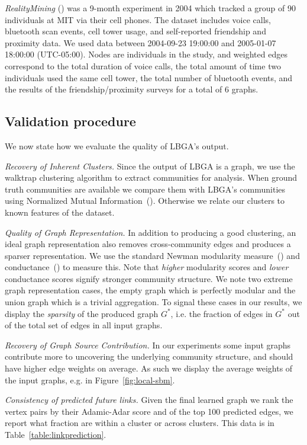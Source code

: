 \documentclass{article}
\begin{document}
\emph{RealityMining} (\cite{RealityMining}) was a 9-month experiment in 2004
which tracked a group of 90 individuals at MIT via their cell phones. The
dataset includes voice calls, bluetooth scan events, cell tower usage, and
self-reported friendship and proximity data. We used data between 2004-09-23
19:00:00 and 2005-01-07 18:00:00 (UTC-05:00). Nodes are individuals in the
study, and weighted edges correspond to the total duration of voice calls, the
total amount of time two individuals used the same cell tower, the total number
of bluetooth events, and the results of the friendship/proximity surveys for a
total of 6 graphs. 

\subsection{Validation procedure} \label{sec:validation}

We now state how we evaluate the quality of LBGA's output.

{\em Recovery of Inherent Clusters.} Since the output of LBGA is a graph, we
use the walktrap clustering algorithm to extract communities for analysis. When
ground truth communities are available we compare them with LBGA's communities
using Normalized Mutual Information~(\cite{Danon05}). Otherwise we relate our
clusters to known features of the dataset. 

{\em Quality of Graph Representation.} In addition to producing a good
clustering, an ideal graph representation also removes cross-community edges
and produces a sparser representation. We use the standard Newman modularity
measure~(\cite{Newman06}) and conductance~(\cite{Leskovec2008}) to
measure this. Note that \emph{higher} modularity scores and \emph{lower}
conductance scores signify stronger community structure. We note two extreme
graph representation cases, the empty graph which is perfectly modular and the
union graph which is a trivial aggregation. To signal these cases in our
results, we display the \emph{sparsity} of the produced graph $G^*$, i.e. the
fraction of edges in $G^*$ out of the total set of edges in all input graphs. 

{\em Recovery of Graph Source Contribution.} In our experiments some input
graphs contribute more to uncovering the underlying community structure, and
should have higher edge weights on average. As such we display the average
weights of the input graphs, e.g. in Figure~\ref{fig:local-sbm}. 

{\em Consistency of predicted future links.} Given the final learned graph
we rank the vertex pairs by their Adamic-Adar score and of the top 100
predicted edges, we report what fraction are within a cluster or across
clusters. This data is in Table~\ref{table:linkprediction}. 
\end{document}
